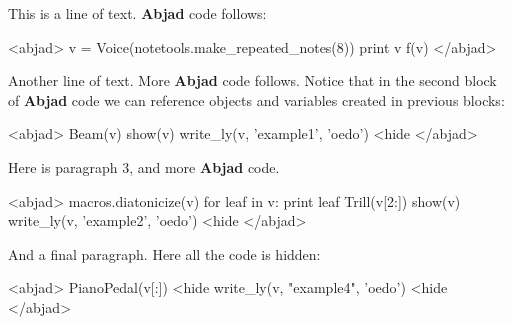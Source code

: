 \documentclass[11pt]{article}
\begin{document}
This is a line of text. \textbf{Abjad} code follows:

<abjad>
v = Voice(notetools.make_repeated_notes(8))
print v
f(v)
</abjad>

Another line of text. More \textbf{Abjad} code follows. Notice that in the second block of \textbf{Abjad} code we can reference objects and variables created in previous blocks:

<abjad>
Beam(v)
show(v)
write_ly(v, 'example1', 'oedo') <hide
</abjad>

Here is paragraph 3, and more \textbf{Abjad} code.

<abjad>
macros.diatonicize(v)
for leaf in v: print leaf
Trill(v[2:])
show(v)
write_ly(v, 'example2', 'oedo') <hide
</abjad>

And a final paragraph. Here all the code is hidden:

<abjad>
PianoPedal(v[:]) <hide
write_ly(v, "example4", 'oedo') <hide
</abjad>
\end{document}
